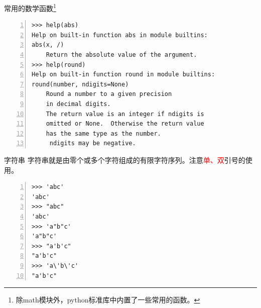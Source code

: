 \documentclass{beamer}
\begin{document}
\begin{frame}[fragile]{常用的数学函数\footnote{除math模块外，python标准库中内置了一些常用的函数。}}

\begin{block}{}
\begin{Verbatim}[numbers=left,frame=single,rulecolor=\color{red}]
>>> help(abs)
Help on built-in function abs in module builtins:
abs(x, /)
    Return the absolute value of the argument.
>>> help(round)
Help on built-in function round in module builtins:
round(number, ndigits=None)
    Round a number to a given precision 
    in decimal digits.
    The return value is an integer if ndigits is 
    omitted or None.  Otherwise the return value 
    has the same type as the number. 
     ndigits may be negative.
\end{Verbatim}
\end{block}
\end{frame}
\begin{frame}[fragile]{字符串}
字符串就是由零个或多个字符组成的有限字符序列。注意\textcolor{red}{单、双}引号的使用。
\begin{block}{}
\begin{Verbatim}[numbers=left,frame=single,rulecolor=\color{red}]
>>> 'abc'
'abc'
>>> "abc"
'abc'
>>> 'a"b"c'
'a"b"c'
>>> "a'b'c"
"a'b'c"
>>> 'a\'b\'c'
"a'b'c"
\end{Verbatim}
\end{block}
\end{frame}

%
\end{document}

